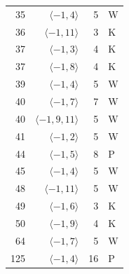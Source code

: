 \begin{longtable}{rrrl}
35 & $\langle -1, 4\rangle$ & 5 & W \\
36 & $\langle -1, 11\rangle$ & 3 & K \\
37 & $\langle -1, 3\rangle$ & 4 & K \\
37 & $\langle -1, 8\rangle$ & 4 & K \\
39 & $\langle -1, 4\rangle$ & 5 & W \\
40 & $\langle -1, 7\rangle$ & 7 & W \\
40 & $\langle -1, 9, 11\rangle$ & 5 & W \\
41 & $\langle -1, 2\rangle$ & 5 & W \\
44 & $\langle -1, 5\rangle$ & 8 & P \\
45 & $\langle -1, 4\rangle$ & 5 & W \\
48 & $\langle -1, 11\rangle$ & 5 & W \\
49 & $\langle -1, 6\rangle$ & 3 & K \\
50 & $\langle -1, 9\rangle$ & 4 & K \\
64 & $\langle -1, 7\rangle$ & 5 & W \\
125 & $\langle -1, 4\rangle$ & 16 & P \\
\bottomrule
\end{longtable}
